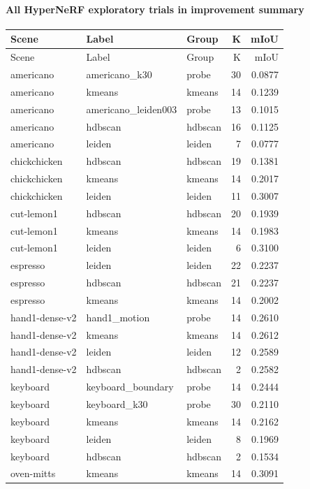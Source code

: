 \documentclass[10pt]{article}
\begin{document}
\paragraph{All HyperNeRF exploratory trials in improvement summary}
\small
\begin{longtable}{lllrr}
\toprule
Scene & Label & Group & K & mIoU \\
\midrule
\endfirsthead
\toprule
Scene & Label & Group & K & mIoU \\
\midrule
\endhead
americano & americano\_k30 & probe & 30 & 0.0877 \\
americano & kmeans & kmeans & 14 & 0.1239 \\
americano & americano\_leiden003 & probe & 13 & 0.1015 \\
americano & hdbscan & hdbscan & 16 & 0.1125 \\
americano & leiden & leiden & 7 & 0.0777 \\
chickchicken & hdbscan & hdbscan & 19 & 0.1381 \\
chickchicken & kmeans & kmeans & 14 & 0.2017 \\
chickchicken & leiden & leiden & 11 & 0.3007 \\
cut-lemon1 & hdbscan & hdbscan & 20 & 0.1939 \\
cut-lemon1 & kmeans & kmeans & 14 & 0.1983 \\
cut-lemon1 & leiden & leiden & 6 & 0.3100 \\
espresso & leiden & leiden & 22 & 0.2237 \\
espresso & hdbscan & hdbscan & 21 & 0.2237 \\
espresso & kmeans & kmeans & 14 & 0.2002 \\
hand1-dense-v2 & hand1\_motion & probe & 14 & 0.2610 \\
hand1-dense-v2 & kmeans & kmeans & 14 & 0.2612 \\
hand1-dense-v2 & leiden & leiden & 12 & 0.2589 \\
hand1-dense-v2 & hdbscan & hdbscan & 2 & 0.2582 \\
keyboard & keyboard\_boundary & probe & 14 & 0.2444 \\
keyboard & keyboard\_k30 & probe & 30 & 0.2110 \\
keyboard & kmeans & kmeans & 14 & 0.2162 \\
keyboard & leiden & leiden & 8 & 0.1969 \\
keyboard & hdbscan & hdbscan & 2 & 0.1534 \\
oven-mitts & kmeans & kmeans & 14 & 0.3091 \\

\end{longtable}
\end{document}
